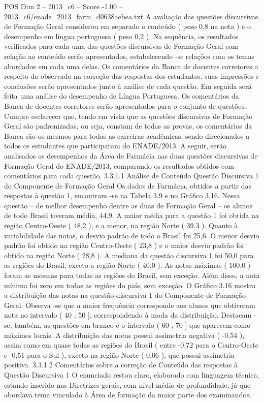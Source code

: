 \begin{textsample}{POS Dim 2 – 2013\_c6 – Score -1.00 – 2013\_c6/enade\_2013\_farm\_d0638aebea.txt}
A avaliação das questões discursivas de Formação Geral considerou em separado o conteúdo ( peso 0,8 na nota ) e o desempenho em língua portuguesa ( peso 0,2 ).
Na sequência, os resultados verificados para cada uma das questões discursivas de Formação Geral com relação ao conteúdo serão apresentados, estabelecendo -se relações com os temas abordados em cada uma delas.
Os comentários da Banca de docentes corretores a respeito do observado na correção das respostas dos estudantes, suas impressões e conclusões serão apresentados junto à análise de cada questão.
Em seguida será feita uma análise do desempenho de Língua Portuguesa.
Os comentários da Banca de docentes corretores serão apresentados para o conjunto de questões.
Cumpre esclarecer que, tendo em vista que as questões discursivas de Formação Geral são padronizadas, ou seja, constam de todas as provas, os comentários da Banca são os mesmos para todas as carreiras acadêmicas, sendo direcionados a todos os estudantes que participaram do ENADE/2013.
A seguir, serão analisados os desempenhos da Área de Farmácia nas duas questões discursivas de Formação Geral do ENADE/2013, comparando os resultados obtidos com comentários para cada questão. 3.3.1.1 Análise de Conteúdo Questão Discursiva 1 do Componente de Formação Geral Os dados de Farmácia, obtidos a partir das respostas à questão 1, encontram -se na Tabela 3.9 e no Gráfico 3.16.
Nessa questão – de melhor desempenho dentre as duas de Formação Geral – os alunos de todo Brasil tiveram média, 44,9.
A maior média para a questão 1 foi obtida na região Centro-Oeste ( 48,2 ), e a menor, na região Norte ( 39,3 ).
Quanto à variabilidade das notas, o desvio padrão de todo o Brasil foi 25,6.
O menor desvio padrão foi obtido na região Centro-Oeste ( 23,8 ) e o maior desvio padrão foi obtido na região Norte ( 28,8 ).
A mediana da questão discursiva 1 foi 50,0 para as regiões do Brasil, exceto a região Norte ( 40,0 ).
As notas máximas ( 100,0 ) foram as mesmas para todas as regiões do Brasil, sem exceção.
Além disso, a nota mínima foi zero em todas as regiões do país, sem exceção.
O Gráfico 3.16 mostra a distribuição das notas na questão discursiva 1 do Componente de Formação Geral.
Observa -se que a maior frequência corresponde aos alunos que obtiveram nota no intervalo ( 40 ; 50 ], correspondendo à moda da distribuição.
Destacam -se, também, as questões em branco e o intervalo ( 60 ; 70 ] que aparecem como máximos locais.
A distribuição das notas possui assimetria negativa ( -0,54 ), assim como em quase todas as regiões do Brasil ( entre -0,72 para o Centro-Oeste e -0,51 para o Sul ), exceto na região Norte ( 0,06 ), que possui assimetria positiva. 3.3.1.2 Comentários sobre a correção de Conteúdo das respostas à Questão Discursiva 1 O enunciado restou claro, elaborado com linguagem técnica, estando inserido nas Diretrizes gerais, com nível médio de profundidade, já que abordava tema vinculado à Área de formação da maior parte dos examinandos.

\end{textsample}
